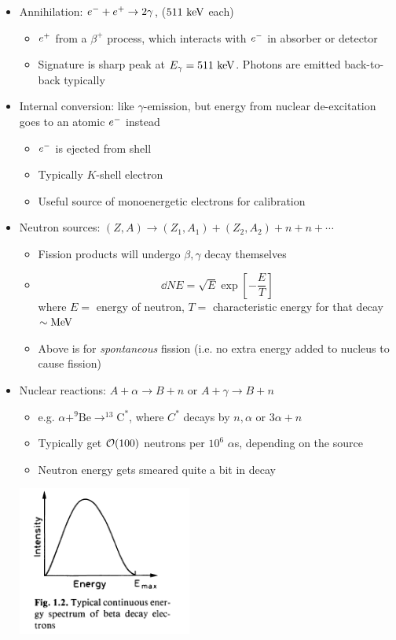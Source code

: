 \begin{itemize}
  \item Annihilation: $e^{-}+e^{+}\rightarrow2\gamma$, ($511~\text{keV}$ each)
  \begin{itemize}
    \item $e^{+}$ from a $\beta^+$ process, which interacts with $e^{-}$ in absorber or detector
    \item Signature is sharp peak at $E_\gamma = 511~\text{keV}$. Photons are emitted back-to-back typically
  \end{itemize}
  \item Internal conversion: like $\gamma$-emission, but energy from nuclear de-excitation goes to an atomic $e^{-}$ instead
  \begin{itemize}
    \item $e^{-}$ is ejected from shell
    \item Typically $K$-shell electron
    \item Useful source of monoenergetic electrons for calibration
  \end{itemize}
  \item Neutron sources: $(Z,A)\rightarrow (Z_1,A_1)  + (Z_2,A_2) + n + n + \cdots$
  \begin{itemize}
    \item Fission products will undergo $\beta,\gamma$ decay themselves
    \item 
    \begin{equation}
      \dd{N}{E} = \sqrt{E} \exp \left[-\frac{E}{T}\right]
    \end{equation}
    where $E =$ energy of neutron, $T =$ characteristic energy for that decay $\sim\text{MeV}$
    \item Above is for \emph{spontaneous} fission (i.e. no extra energy added to nucleus to cause fission)
  \end{itemize}
  \item Nuclear reactions: $A+\alpha\rightarrow B+n$ or $A+\gamma \rightarrow B+n$
  \begin{itemize}
    \item e.g. $\alpha + ^9\text{Be} \rightarrow ^{13}\text{C}^*$, where $C^*$ decays by $n,\alpha$ or $3\alpha+n$
    \item Typically get $\mathcal{O}(100)$ neutrons per $10^6$ $\alpha$s, depending on the source
    \item Neutron energy gets smeared quite a bit in decay
  \end{itemize}
\begin{center}
  \includegraphics[width=0.45\textwidth,valign=t]{figs/q_beta.png}

\end{center}
\end{itemize}
